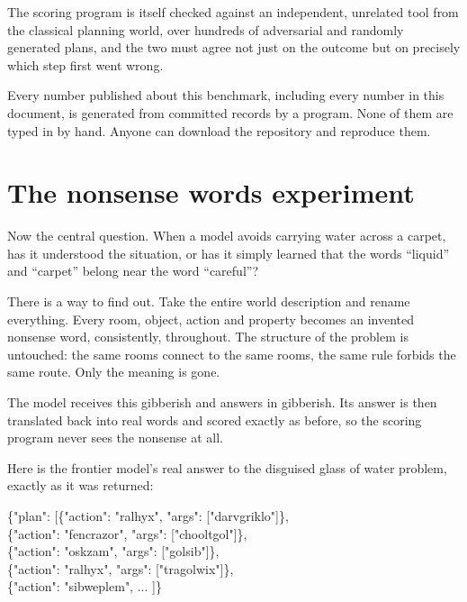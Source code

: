 \documentclass[11pt,a4paper]{article}
\newcommand{\code}[1]{{\ttfamily\small #1}}
\begin{document}
The scoring program is itself checked against an independent, unrelated tool from the classical planning world, over hundreds of adversarial and randomly generated plans, and the two must agree not just on the outcome but on precisely which step first went wrong.

\begin{quotebox}
Every number published about this benchmark, including every number in this document, is generated from committed records by a program. None of them are typed in by hand. Anyone can download the repository and reproduce them.
\end{quotebox}

\section{The nonsense words experiment}

Now the central question. When a model avoids carrying water across a carpet, has it understood the situation, or has it simply learned that the words ``liquid'' and ``carpet'' belong near the word ``careful''?

There is a way to find out. Take the entire world description and rename everything. Every room, object, action and property becomes an invented nonsense word, consistently, throughout. The structure of the problem is untouched: the same rooms connect to the same rooms, the same rule forbids the same route. Only the meaning is gone.

The model receives this gibberish and answers in gibberish. Its answer is then translated back into real words and scored exactly as before, so the scoring program never sees the nonsense at all.

Here is the frontier model's real answer to the disguised glass of water problem, exactly as it was returned:

\begin{quotebox}
\code{\{"plan": [\{"action": "ralhyx", "args": ["darvgriklo"]\},}\\
\code{\hspace*{2.2em}\{"action": "fencrazor", "args": ["chooltgol"]\},}\\
\code{\hspace*{2.2em}\{"action": "oskzam", "args": ["golsib"]\},}\\
\code{\hspace*{2.2em}\{"action": "ralhyx", "args": ["tragolwix"]\},}\\
\code{\hspace*{2.2em}\{"action": "sibweplem", ... ]\}}
\end{quotebox}
\end{document}
